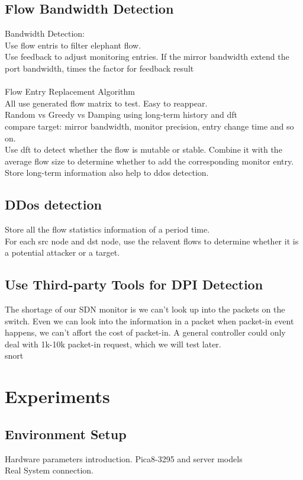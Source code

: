 \documentclass{acm_proc_article-sp}
\begin{document}
\subsection{Flow Bandwidth Detection}
Bandwidth Detection:\\
Use flow entris to filter elephant flow.\\
Use feedback to adjust monitoring entries. If the mirror bandwidth extend the port bandwidth, times the factor for feedback result\\
\\
Flow Entry Replacement Algorithm\\
All use generated flow matrix to test. Easy to reappear.\\
Random vs Greedy vs Damping using long-term history and dft\\
compare target: mirror bandwidth,  monitor precision, entry change time and so on.\\
Use dft to detect whether the flow is mutable or stable. Combine it with the average flow size to determine whether to add the corresponding monitor entry.\\
Store long-term information also help to ddos detection.\\

\subsection{DDos detection}
Store all the flow statistics information of a period time.\\
For each src node and dst node, use the relavent flows to determine whether it is a potential attacker or a target.

\subsection{Use Third-party Tools for DPI Detection}
The shortage of our SDN monitor is we can't look up into the packets on the switch. Even we can look into the information in a packet when packet-in event happens, we can't affort the cost of packet-in. A general controller could only deal with 1k-10k packet-in request, which we will test later.\\
snort


\section{Experiments}

\subsection{Environment Setup}
Hardware parameters introduction. Pica8-3295 and server models\\
Real System connection.\\
\end{document}
